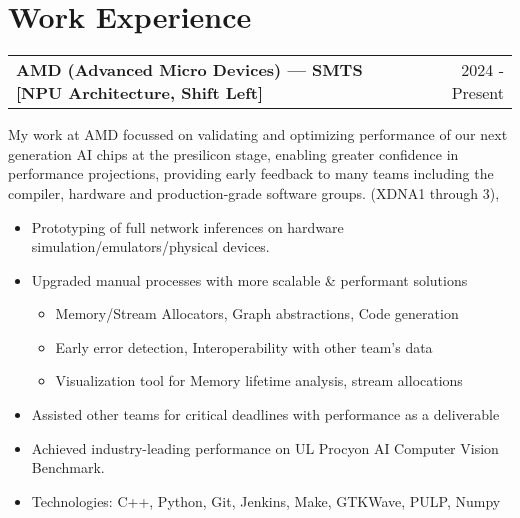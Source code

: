 \documentclass[a4paper,12pt]{article}
\makeatletter
\newenvironment{jobshort}[2]
    {
    \begin{tabularx}{\linewidth}{@{}l X r@{}}
    \textbf{#1} & \hfill &  #2 \\[3.75pt]
    \end{tabularx}
    }
    {
    }
\makeatother
\begin{document}
\section{Work Experience}

\begin{jobshort}{AMD (Advanced Micro Devices) --- SMTS [NPU Architecture, Shift Left]}{2024 - Present}
My work at AMD focussed on validating and optimizing performance of our next generation AI chips at the presilicon stage, enabling greater confidence in performance projections, providing early feedback to many teams including the compiler, hardware and production-grade software groups. (XDNA1 through 3), 


\begin{itemize}[noitemsep,topsep=0pt,parsep=0pt,partopsep=0pt]
    \item Prototyping of full network inferences on hardware simulation/emulators/physical devices.
    \item Upgraded manual processes with more scalable \& performant solutions 
    \begin{itemize}
        \item Memory/Stream Allocators, Graph abstractions, Code generation
        \item Early error detection, Interoperability with other team's data
        \item Visualization tool for Memory lifetime analysis, stream allocations
    \end{itemize}
    \item Assisted other teams for critical deadlines with performance as a deliverable
    \item Achieved industry-leading performance on UL Procyon AI Computer Vision Benchmark.
    \item Technologies: C++, Python, Git, Jenkins, Make, GTKWave, PULP, Numpy
\end{itemize}

\end{jobshort}
\end{document}
